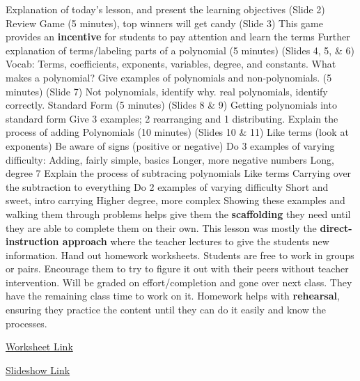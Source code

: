 \begin{outline}
    \1 Explanation of today’s lesson, and present the learning objectives (Slide 2)
    \1 Review Game (5 minutes), top winners will get candy (Slide 3)
        \2 This game provides an \textbf{incentive} for students to pay attention and learn the terms
    \1 Further explanation of terms/labeling parts of a polynomial (5 minutes) (Slides 4, 5, \& 6)
        \2 Vocab: Terms, coefficients, exponents, variables, degree, and constants.
        \2 What makes a polynomial?
    \1 Give examples of polynomials and non-polynomials. (5 minutes) (Slide 7)
         Not polynomials, identify why.
         real polynomials, identify correctly.
    \1 Standard Form (5 minutes) (Slides 8 \& 9)
        \2 Getting polynomials into standard form 
            \3 Give 3 examples; 2 rearranging and 1 distributing.
    \1 Explain the process of adding Polynomials (10 minutes) (Slides 10 \& 11)
        \2 Like terms (look at exponents)
        \2 Be aware of signs (positive or negative)
        \2 Do 3 examples of varying difficulty:
            \3 Adding, fairly simple, basics
            \3 Longer, more negative numbers
            \3 Long, degree 7
    \1 Explain the process of subtracing polynomials
        \2 Like terms
        \2 Carrying over the subtraction to everything
        \2 Do 2 examples of varying difficulty
            \3 Short and sweet, intro carrying
            \3 Higher degree, more complex
        \2 Showing these examples and walking them through problems helps give them the \textbf{scaffolding} they need until they are able to complete them on their own.
            \3 This lesson was mostly the \textbf{direct-instruction approach} where the teacher lectures to give the students new information.
    \1 Hand out homework worksheets. Students are free to work in groups or pairs. Encourage them to try to figure it out with their peers without teacher intervention. Will be graded on effort/completion and gone over next class. They have the remaining class time to work on it.
        \2 Homework helps with \textbf{rehearsal}, ensuring they practice the content until they can do it easily and know the processes.
\end{outline}

\href{https://kutasoftware.com/FreeWorksheets/Alg1Worksheets/Adding+Subtracting%20Polynomials.pdf}{Worksheet Link}

\href{https://www.canva.com/design/DAF0A7UZXcA/X2H6gbI5I4nYcRe6sKrcHQ/edit?utm_content=DAF0A7UZXcA&utm_campaign=designshare&utm_medium=link2&utm_source=sharebutton}{Slideshow Link}


